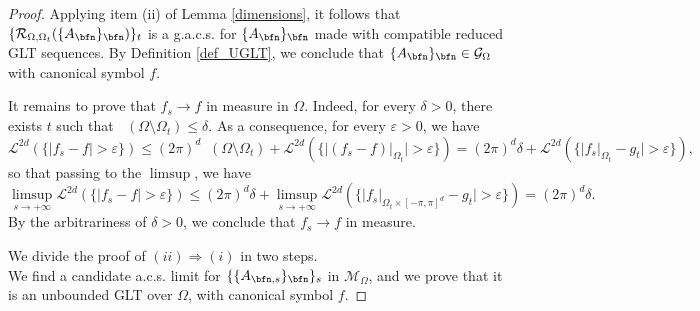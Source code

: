 \documentclass{amsart}
\DeclareMathOperator{\Ld}{\mathcal{L}^d}
\begin{document}
\begin{proof}
    Applying item (ii) of Lemma \ref{dimensions}, it follows that $\{\mathcal{R}_{\Omega,\Omega_t}(\{A_\bfn\}_\bfn)\}_t$ is a g.a.c.s. for $\{A_\bfn\}_\bfn$ made with compatible reduced GLT sequences. By Definition \ref{def_UGLT}, we conclude that $\{A_\bfn\}_\bfn\in\mathcal{G}_\Omega$ with canonical symbol $f$.
    
    It remains to prove that $f_s\to f$ in measure in $\Omega$. Indeed, for every $\delta>0$, there exists $t$ such that $\Ld(\Omega\setminus\Omega_t)\leq\delta$. As a consequence, for every $\varepsilon>0$, we have
    \begin{equation*}
        \mathcal{L}^{2d}(\{|f_s-f|>\varepsilon\})\leq (2\pi)^d\Ld(\Omega\setminus\Omega_t)+\mathcal{L}^{2d}(\{|(f_s-f)|_{\Omega_t}|>\varepsilon\})=(2\pi)^d\delta+\mathcal{L}^{2d}(\{|f_s|_{\Omega_t}-g_t|>\varepsilon\}),
    \end{equation*}
    so that passing to the $\limsup$, we have
    \begin{equation*}
        \limsup\limits_{s\to+\infty}\mathcal{L}^{2d}(\{|f_s-f|>\varepsilon\})\leq (2\pi)^d\delta+\limsup\limits_{s\to+\infty}\mathcal{L}^{2d}(\{|f_s|_{\Omega_t\times[-\pi,\pi]^d}-g_t|>\varepsilon\})=(2\pi)^d\delta.
    \end{equation*}
    By the arbitrariness of $\delta>0$, we conclude that $f_s\to f$ in measure.

    We divide the proof of $(ii)\Rightarrow(i)$ in two steps.\\
     We find a candidate a.c.s. limit for $\{\{A_{\bfn,s}\}_\bfn\}_s$ in $\mathcal{M}_\Omega$, and we prove that it is an unbounded GLT over $\Omega$, with canonical symbol $f$.
    

\end{proof}
\end{document}
